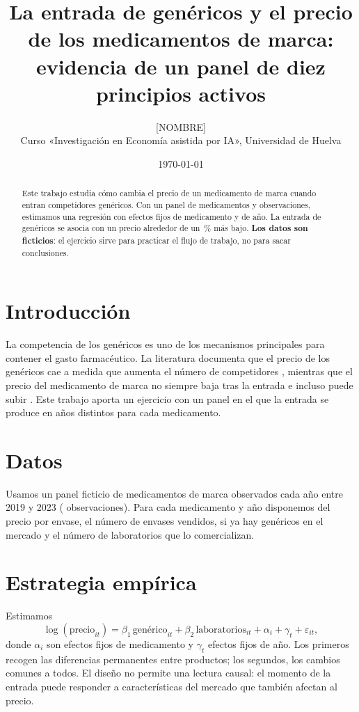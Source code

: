 \documentclass[11pt,a4paper]{article}
\title{La entrada de genéricos y el precio de los medicamentos de marca:\\
evidencia de un panel de diez principios activos}
\author{[NOMBRE]\\ \small Curso «Investigación en Economía asistida por IA», Universidad de Huelva}
\date{\today}
\begin{document}
\maketitle

\begin{abstract}
\noindent Este trabajo estudia cómo cambia el precio de un medicamento de marca cuando entran competidores genéricos. Con un panel de \nmedicamentos{} medicamentos y \nobs{} observaciones, estimamos una regresión con efectos fijos de medicamento y de año. La entrada de genéricos se asocia con un precio alrededor de un \caidagenerico\,\% más bajo. \textbf{Los datos son ficticios}: el ejercicio sirve para practicar el flujo de trabajo, no para sacar conclusiones.
\end{abstract}

\section{Introducción}

La competencia de los genéricos es uno de los mecanismos principales para contener el gasto farmacéutico. La literatura documenta que el precio de los genéricos cae a medida que aumenta el número de competidores \citep{reiffen2005}, mientras que el precio del medicamento de marca no siempre baja tras la entrada e incluso puede subir \citep{grabowski1992,frank1997}. Este trabajo aporta un ejercicio con un panel en el que la entrada se produce en años distintos para cada medicamento.

\section{Datos}

Usamos un panel ficticio de \nmedicamentos{} medicamentos de marca observados cada año entre 2019 y 2023 (\nobs{} observaciones). Para cada medicamento y año disponemos del precio por envase, el número de envases vendidos, si ya hay genéricos en el mercado y el número de laboratorios que lo comercializan.

\section{Estrategia empírica}

Estimamos
\begin{equation}
\log(\text{precio}_{it}) = \beta_1\, \text{genérico}_{it} + \beta_2\, \text{laboratorios}_{it} + \alpha_i + \gamma_t + \varepsilon_{it},
\end{equation}
donde $\alpha_i$ son efectos fijos de medicamento y $\gamma_t$ efectos fijos de año. Los primeros recogen las diferencias permanentes entre productos; los segundos, los cambios comunes a todos. El diseño no permite una lectura causal: el momento de la entrada puede responder a características del mercado que también afectan al precio.
\end{document}
